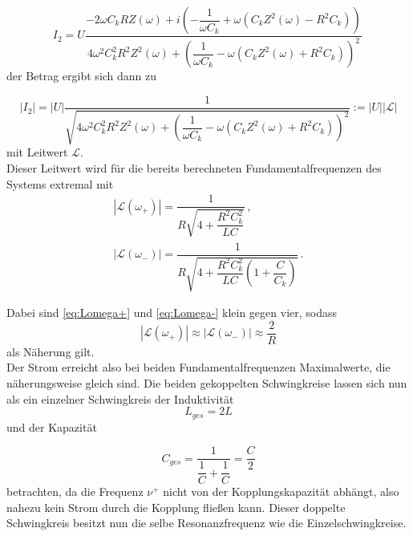 \begin{equation}
    I_2 = U \dfrac{-2 ω C_k R Z(ω) + i \left(-\dfrac{1}{ωC_k} + ω (C_k Z^2(ω) -  R^2 C_k) \right)}{4 ω^2 C^2_k R^2 Z^2(ω) + \left(\dfrac{1}{ω C_k} - ω (C_k Z^2(ω) +  R^2 C_k) \right)^2}\,
\end{equation} der Betrag ergibt sich dann zu

\begin{equation}
    |I_2| = |U| \dfrac{1}{\sqrt{4 ω^2 C^2_k R^2 Z^2(ω) + \left(\dfrac{1}{ω C_k} - ω (C_k Z^2(ω) +  R^2 C_k) \right)^2}} := |U||\mathcal{L}|
\end{equation} mit Leitwert $\mathcal{L}$.\\

Dieser Leitwert wird für die bereits berechneten Fundamentalfrequenzen des Systems extremal mit
\begin{align}
    |\mathcal{L}(ω_+)| = \dfrac{1}{R \sqrt{4+ \dfrac{R^2 C^2_k}{L C}}} \label{eq:Lomega+}\,, \\
    |\mathcal{L}(ω_-)| = \dfrac{1}{R \sqrt{4+ \dfrac{R^2 C^2_k}{L C} \left(1 + \dfrac{C}{C_k}\right)}} \label{eq:Lomega-}\,.
\end{align}

Dabei sind \eqref{eq:Lomega+} und \eqref{eq:Lomega-} klein gegen vier, sodass
\begin{equation*}
    |\mathcal{L}(ω_+)| \approx |\mathcal{L}(ω_-)| \approx \dfrac{2}{R} 
\end{equation*} als Näherung gilt. \\

Der Strom erreicht also bei beiden Fundamentalfrequenzen Maximalwerte, die näherungsweise gleich sind. Die beiden gekoppelten Schwingkreise lassen sich nun als ein einzelner Schwingkreis der Induktivität
\begin{equation*}
    L_{ges} = 2 L
\end{equation*} und der Kapazität 

\begin{equation*}
    C_{ges} = \dfrac{1}{\dfrac{1}{C} + \dfrac{1}{C}} = \dfrac{C}{2}
\end{equation*} betrachten, da die Frequenz $ν^+$ nicht von der Kopplungskapazität abhängt, also nahezu kein Strom durch die Kopplung fließen kann.
Dieser doppelte Schwingkreis besitzt nun die selbe Resonanzfrequenz wie die Einzelschwingkreise. 

